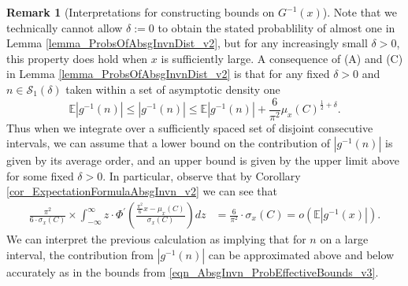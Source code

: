 \documentclass[11pt,reqno,a4letter]{article}
\numberwithin{figure}{section}
\numberwithin{table}{section}
\theoremstyle{plain}
\numberwithin{theorem}{section}
\theoremstyle{definition}
\newtheorem{remark}[theorem]{Remark}
\begin{document}
\begin{remark}[Interpretations for constructing bounds on $G^{-1}(x)$] 
Note that we technically cannot allow $\delta := 0$ to obtain the stated probablility of almost one 
in Lemma \ref{lemma_ProbsOfAbsgInvnDist_v2}, 
but for any increasingly small $\delta > 0$, this property does hold when $x$ is sufficiently large. 
A consequence of (A) and (C) in Lemma \ref{lemma_ProbsOfAbsgInvnDist_v2} 
is that for any fixed $\delta > 0$ and $n \in \mathcal{S}_1(\delta)$ 
taken within a set of asymptotic density one 
\begin{equation} 
\label{eqn_AbsgInvn_ProbEffectiveBounds_v3} 
\mathbb{E}|g^{-1}(n)| \leq |g^{-1}(n)| \leq \mathbb{E}|g^{-1}(n)| + \frac{6}{\pi^2} 
     \mu_x(C)^{\frac{1}{2} + \delta}. 
\end{equation} 
Thus when we integrate over a sufficiently spaced set of disjoint consecutive intervals, 
we can assume that a lower bound on the contribution of $|g^{-1}(n)|$ is given by its average 
order, and an upper bound is given by the upper limit above for some fixed $\delta > 0$. 
In particular, observe that by 
Corollary \ref{cor_ExpectationFormulaAbsgInvn_v2} 
we can see that 
\begin{align*} 
\frac{\pi^2}{6 \cdot \sigma_x(C)} \times \int_{-\infty}^{\infty} z \cdot 
     \Phi^{\prime}\left(\frac{\frac{\pi^2}{6} x - \mu_x(C)}{\sigma_x(C)}\right) dz & = 
     \frac{6}{\pi^2} \cdot \sigma_x(C) = o\left(\mathbb{E}|g^{-1}(x)|\right). 
\end{align*} 
We can interpret the previous calculation as implying that for $n$ on a large 
interval, the contribution from $|g^{-1}(n)|$ can be approximated above and below 
accurately as in the bounds from \eqref{eqn_AbsgInvn_ProbEffectiveBounds_v3}. 
\end{remark} 
\end{document}
